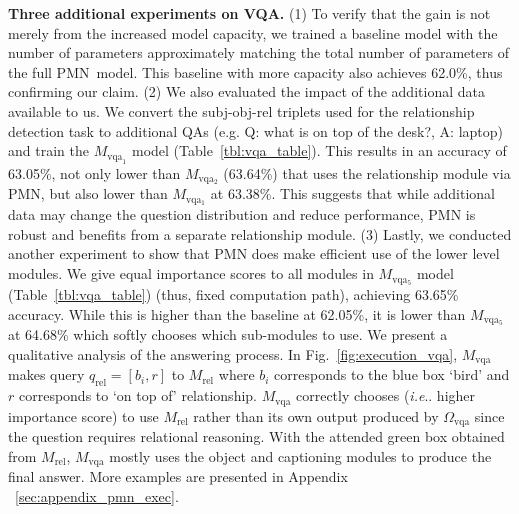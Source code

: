 \documentclass{article}
\makeatletter
\def\PMN{PMN}
\def\Mrel{M_\mathrm{rel}}
\def\Mvqa{M_\mathrm{vqa}}
\newcommand{\rMvqa}[1]{M_{\mathrm{vqa}_{#1}}}
\DeclareRobustCommand\onedot{\futurelet\@let@token\@onedot}
\def\@onedot{\ifx\@let@token.\else.\null\fi\xspace}
\def\ie{\emph{i.e}\onedot} \def\Ie{\emph{I.e}\onedot}
\makeatother
\begin{document}
\textbf{Three additional experiments on VQA.}\hspace{2mm}
(1) To verify that the gain is not merely from the increased model capacity, we trained a baseline model with the number of parameters approximately matching the total number of parameters of the full \PMN~model.
This baseline with more capacity also achieves 62.0\%, thus confirming our claim.
(2) We also evaluated the impact of the additional data available to us.
We convert the subj-obj-rel triplets used for the relationship detection task to additional QAs (e.g. Q: what is on top of the desk?, A: laptop) and train the $\rMvqa{1}$ model (Table~\ref{tbl:vqa_table}).
This results in an accuracy of 63.05\%, not only lower than $M_\mathrm{vqa_2}$ (63.64\%) that uses the relationship module via PMN, but also lower than $M_\mathrm{vqa_1}$ at 63.38\%.
This suggests that while additional data may change the question distribution and reduce performance, PMN is robust and benefits from a separate relationship module.
(3) Lastly, we conducted another experiment to show that PMN does make efficient use of the lower level modules.
We give equal importance scores to all modules in $M_\mathrm{vqa_5}$ model (Table~\ref{tbl:vqa_table}) (thus, fixed computation path), achieving 63.65\% accuracy.
While this is higher than the baseline at 62.05\%, it is lower than $M_\mathrm{vqa_5}$ at 64.68\% which softly chooses which sub-modules to use. %
We present a qualitative analysis of the answering process.
In Fig.~\ref{fig:execution_vqa}, $\Mvqa$ makes query $q_\mathrm{rel}=[b_i, r]$ to $\Mrel$ where $b_i$ corresponds to the blue box `bird' and $r$ corresponds to `on top of' relationship.
$\Mvqa$ correctly chooses (\ie higher importance score) to use  $\Mrel$ rather than its own output produced by $\Omega_\mathrm{vqa}$ since the question requires relational reasoning.
With the attended green box obtained from $\Mrel$, $\Mvqa$ mostly uses the object and captioning modules to produce the final answer.
More examples are presented in Appendix ~\ref{sec:appendix_pmn_exec}.
\end{document}
